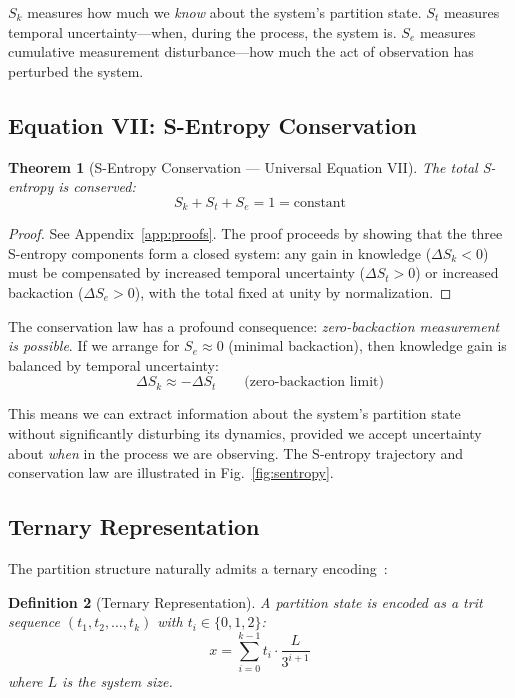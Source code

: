 \documentclass[aps,prx,superscriptaddress,twocolumn,10pt,a4paper,longbibliography,preprint]{revtex4-2}
\newtheorem{theorem}{Theorem}[section]
\newtheorem{defn}[theorem]{Definition}
\theoremstyle{definition}
\theoremstyle{remark}
\begin{document}
$S_k$ measures how much we \emph{know} about the system's partition state. $S_t$ measures temporal uncertainty---when, during the process, the system is. $S_e$ measures cumulative measurement disturbance---how much the act of observation has perturbed the system.

\subsection{Equation VII: S-Entropy Conservation}

\begin{theorem}[S-Entropy Conservation --- Universal Equation VII]
\label{thm:conservation}
The total S-entropy is conserved:
\begin{equation}
\boxed{S_k + S_t + S_e = 1 = \text{constant}}
\label{eq:conservation}
\end{equation}
\end{theorem}

\begin{proof}
See Appendix~\ref{app:proofs}. The proof proceeds by showing that the three S-entropy components form a closed system: any gain in knowledge ($\Delta S_k < 0$) must be compensated by increased temporal uncertainty ($\Delta S_t > 0$) or increased backaction ($\Delta S_e > 0$), with the total fixed at unity by normalization.
\end{proof}

The conservation law has a profound consequence: \emph{zero-backaction measurement is possible}. If we arrange for $S_e \approx 0$ (minimal backaction), then knowledge gain is balanced by temporal uncertainty:
\begin{equation}
\Delta S_k \approx -\Delta S_t \qquad \text{(zero-backaction limit)}
\end{equation}

This means we can extract information about the system's partition state without significantly disturbing its dynamics, provided we accept uncertainty about \emph{when} in the process we are observing. The S-entropy trajectory and conservation law are illustrated in Fig.~\ref{fig:sentropy}.

\subsection{Ternary Representation}

The partition structure naturally admits a ternary encoding~\cite{Sachikonye2026b}:

\begin{defn}[Ternary Representation]
A partition state is encoded as a trit sequence $(t_1, t_2, \ldots, t_k)$ with $t_i \in \{0, 1, 2\}$:
\begin{equation}
x = \sum_{i=0}^{k-1} t_i \cdot \frac{L}{3^{i+1}}
\label{eq:ternary_position}
\end{equation}
where $L$ is the system size.
\end{defn}
\end{document}
